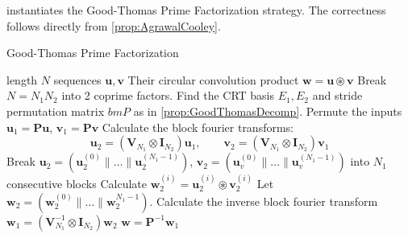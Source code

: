  instantiates the Good-Thomas Prime Factorization strategy. The correctness follows directly from \cref{prop:AgrawalCooley}.
\begin{algorithm}[h]
    \caption{Good-Thomas Prime Factorization}\label{alg:GoodThomas}
    \begin{algorithmic}[1]
         length \(N\) sequences \(\bm{u}, \bm{v}\)
        \Ensure Their circular convolution product \(\bm{w} = \bm{u} \circledast \bm{v}\)
        \State Break \(N = N_1 N_2\) into 2 coprime factors. Find the CRT basis \(E_1, E_2\) and stride permutation matrix \(bm{P}\) as in \cref{prop:GoodThomasDecomp}.
        \State Permute the inputs \(\bm{u}_1 = \bm{P} \bm{u}\), \(\bm{v}_1 = \bm{P} \bm{v}\)
        \State Calculate the block fourier transforms:
        \[ \bm{u}_2 = \left(\bm{V}_{N_1} \otimes \bm{I}_{N_2}\right) \bm{u}_1, \qquad \bm{v}_2 = \left(\bm{V}_{N_1} \otimes \bm{I}_{N_2}\right) \bm{v}_1\] 
        \State Break \(\bm{u}_2 = (\bm{u}_2^{(0)} \parallel \ldots \parallel \bm{u}_2^{(N_1 - 1)})\), \(\bm{v}_2 = (\bm{u}_v^{(0)} \parallel \ldots \parallel \bm{u}_v^{(N_1 - 1)})\) into \(N_1\) consecutive blocks
            \State Calculate \(\bm{w}_2^{(i)} = \bm{u}_2^{(i)} \circledast \bm{v}_2^{(i)}\) 
        \EndFor
        \State Let \(\bm{w}_2 = (\bm{w}_2^{(0)} \parallel \ldots \parallel \bm{w}_2^{N_1 - 1})\). Calculate the inverse block fourier transform \(\bm{w}_1 = \left(\bm{V}_{N_1}^{-1} \otimes \bm{I}_{N_2}\right) \bm{w}_2\)
         \(\bm{w} = \bm{P}^{-1} \bm{w}_1\)
    \end{algorithmic}
\end{algorithm}
